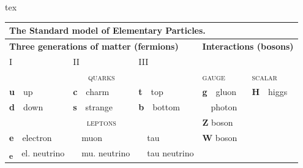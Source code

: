 \begin{codebox}{tex}
    \begin{table}[!htb]\small
        \begin{tabular}{lllll}
            \multicolumn{5}{l}{\textbf{The Standard model of Elementary Particles.}}                                                                                                                                                               \\
            \toprule
            \multicolumn{3}{l}{\textbf{Three generations of matter (fermions)}} & \multicolumn{2}{l}{\textbf{Interactions (bosons)}}                                                                                                               \\
            I                                                                   & II                                                    & III                                                    &                             &                   \\
            \multicolumn{3}{c}{\textsc{quarks}}                                 & \textsc{gauge}                                        & \textsc{scalar}                                                                                          \\
            \cmidrule(lr){1-3}\cmidrule(lr){4-4}\cmidrule(lr){5-5}
            \textbf{u}~~up                                                      & \textbf{c}~~charm                                     & \textbf{t}~~top                                        & \textbf{g}~~gluon           & \textbf{H}~~higgs \\
            \textbf{d}~~down                                                    & \textbf{s}~~strange                                   & \textbf{b}~~bottom                                     & \textbf{\textgamma}~~photon &                   \\
            \multicolumn{3}{c}{\textsc{leptons}}                                & \textbf{Z} boson                                      &                                                                                                          \\
            \cmidrule(lr){1-3}
            \textbf{e}~~electron                                                & \textbf{\textmu}~~muon                                & \textbf{\texttau}~~tau                                 & \textbf{W} boson            &                   \\
            \textbf{\textnu\textsubscript{e}}~~el. neutrino                     & \textbf{\textnu\textsubscript{\textmu}}~~mu. neutrino & \textbf{\textnu\textsubscript{\texttau}}~~tau neutrino &                             &                   \\
            \bottomrule
        \end{tabular}
    \end{table}
\end{codebox}

